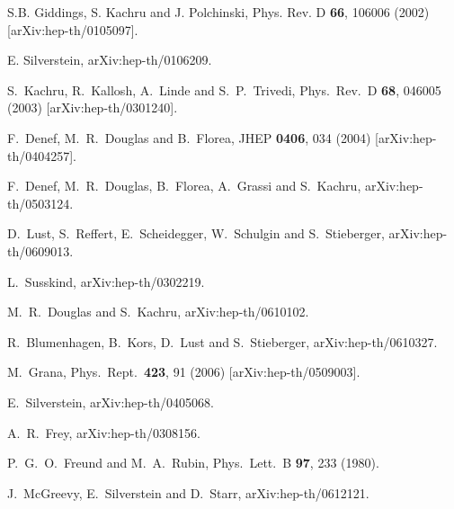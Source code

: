 \documentclass[aps,amsfonts]{ar2e}
\begin{document}
\begin{thebibliography}{999}
S.B. Giddings, S. Kachru and J. Polchinski, Phys. Rev. D {\bf 66},
106006 (2002) [arXiv:hep-th/0105097].

E. Silverstein, arXiv:hep-th/0106209.

  S.~Kachru, R.~Kallosh, A.~Linde and S.~P.~Trivedi,
  Phys.\ Rev.\ D {\bf 68}, 046005 (2003)
  [arXiv:hep-th/0301240].

F.~Denef, M.~R.~Douglas and B.~Florea, JHEP {\bf 0406}, 034 (2004)
[arXiv:hep-th/0404257].

F.~Denef, M.~R.~Douglas, B.~Florea, A.~Grassi and S.~Kachru,
arXiv:hep-th/0503124.

D.~Lust, S.~Reffert, E.~Scheidegger, W.~Schulgin and S.~Stieberger,
arXiv:hep-th/0609013.


  L.~Susskind,
  arXiv:hep-th/0302219.

  M.~R.~Douglas and S.~Kachru,
  arXiv:hep-th/0610102.

R.~Blumenhagen, B.~Kors, D.~Lust and S.~Stieberger,
arXiv:hep-th/0610327.


  M.~Grana,
  Phys.\ Rept.\  {\bf 423}, 91 (2006)
  [arXiv:hep-th/0509003].

  E.~Silverstein,
  arXiv:hep-th/0405068.

  A.~R.~Frey,
  arXiv:hep-th/0308156.

  P.~G.~O.~Freund and M.~A.~Rubin,
  Phys.\ Lett.\ B {\bf 97}, 233 (1980).

  J.~McGreevy, E.~Silverstein and D.~Starr,
  arXiv:hep-th/0612121.


\end{thebibliography}
\end{document}
